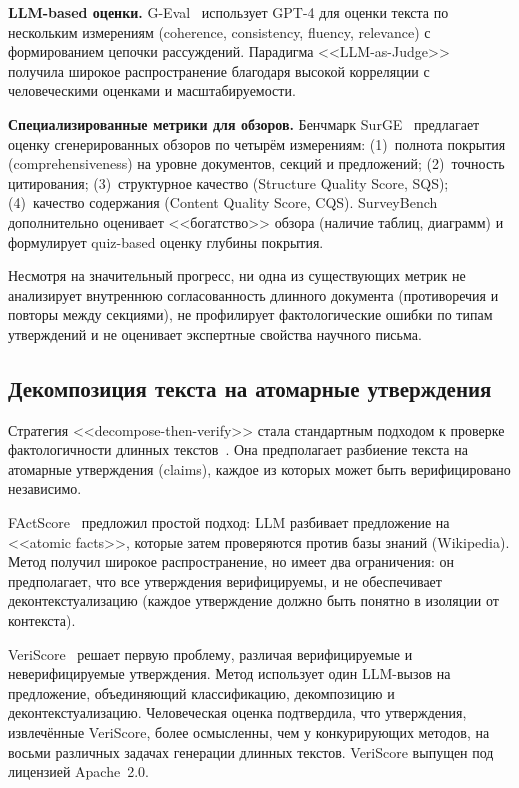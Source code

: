 \documentclass[a4paper,14pt]{extarticle}
\begin{document}
\textbf{LLM-based оценки.} G-Eval~\cite{liu2023geval} использует GPT-4 для оценки текста по нескольким измерениям (coherence, consistency, fluency, relevance) с формированием цепочки рассуждений. Парадигма <<LLM-as-Judge>>~\cite{zheng2024llm_judge} получила широкое распространение благодаря высокой корреляции с человеческими оценками и масштабируемости.

\textbf{Специализированные метрики для обзоров.} Бенчмарк SurGE~\cite{su2025surge} предлагает оценку сгенерированных обзоров по четырём измерениям: (1)~полнота покрытия (comprehensiveness) на уровне документов, секций и предложений; (2)~точность цитирования; (3)~структурное качество (Structure Quality Score, SQS); (4)~качество содержания (Content Quality Score, CQS). SurveyBench~\cite{sun2025surveybench} дополнительно оценивает <<богатство>> обзора (наличие таблиц, диаграмм) и формулирует quiz-based оценку глубины покрытия.

Несмотря на значительный прогресс, ни одна из существующих метрик не анализирует внутреннюю согласованность длинного документа (противоречия и повторы между секциями), не профилирует фактологические ошибки по типам утверждений и не оценивает экспертные свойства научного письма.


\subsection{Декомпозиция текста на атомарные утверждения}

Стратегия <<decompose-then-verify>> стала стандартным подходом к проверке фактологичности длинных текстов~\cite{min2023factscore}. Она предполагает разбиение текста на атомарные утверждения (claims), каждое из которых может быть верифицировано независимо.

FActScore~\cite{min2023factscore} предложил простой подход: LLM разбивает предложение на <<atomic facts>>, которые затем проверяются против базы знаний (Wikipedia). Метод получил широкое распространение, но имеет два ограничения: он предполагает, что все утверждения верифицируемы, и не обеспечивает деконтекстуализацию (каждое утверждение должно быть понятно в изоляции от контекста).

VeriScore~\cite{song2024veriscore} решает первую проблему, различая верифицируемые и неверифицируемые утверждения. Метод использует один LLM-вызов на предложение, объединяющий классификацию, декомпозицию и деконтекстуализацию. Человеческая оценка подтвердила, что утверждения, извлечённые VeriScore, более осмысленны, чем у конкурирующих методов, на восьми различных задачах генерации длинных текстов. VeriScore выпущен под лицензией Apache~2.0.
\end{document}
